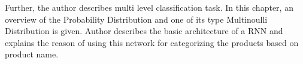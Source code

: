 Further, the author describes multi level classification task.  In this chapter, an overview of the Probability Distribution and one of its type Multinoulli Distribution is given. Author describes the basic architecture of a \acl{RNN} and explains the reason of using this network for categorizing the products based on product name.  